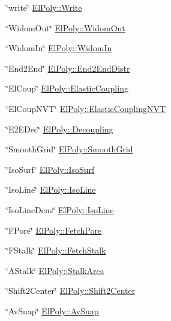 \begin{DoxyItemize}
\item \char`\"{}write\char`\"{} \hyperlink{classVarData_a054aab836dcf7735720ef32e0b8f7ecb}{\-El\-Poly\-::\-Write} 
\item \char`\"{}\-Widom\-Out\char`\"{} \hyperlink{classElPoly_aa7a92147aff6a466398908e0f92ca139}{\-El\-Poly\-::\-Widom\-Out} 
\item \char`\"{}\-Widom\-In\char`\"{} \hyperlink{classElPoly_a3e5c7ada1f6d5a2d37b23a9fb12771f9}{\-El\-Poly\-::\-Widom\-In} 
\item \char`\"{}\-End2\-End\char`\"{} \hyperlink{classElPoly_a15ee2b235143aabc133fe974aa3258a2}{\-El\-Poly\-::\-End2\-End\-Distr} 
\item \char`\"{}\-El\-Coup\char`\"{} \hyperlink{classElPoly_a48968ddc44376e55852e9720b3827ebe}{\-El\-Poly\-::\-Elastic\-Coupling} 
\item \char`\"{}\-El\-Coup\-N\-V\-T\char`\"{} \hyperlink{classElPoly_ab88192e9e4e0f11b68ad828d73ff8957}{\-El\-Poly\-::\-Elastic\-Coupling\-N\-V\-T} 
\item \char`\"{}\-E2\-E\-Dec\char`\"{} \hyperlink{classElPoly_a44e20767e332d941b94906f1a8e60e24}{\-El\-Poly\-::\-Decoupling} 
\item \char`\"{}\-Smooth\-Grid\char`\"{} \hyperlink{classVarData_a3d0e967c8f2515c16170245de47ffcbe}{\-El\-Poly\-::\-Smooth\-Grid} 
\item \char`\"{}\-Iso\-Surf\char`\"{} \hyperlink{classElPoly_a23b08e53b2acd3090051d2034632c20f}{\-El\-Poly\-::\-Iso\-Surf} 
\item \char`\"{}\-Iso\-Line\char`\"{} \hyperlink{classElPoly_a7af346569b401863e3d5f4541e85e0c4}{\-El\-Poly\-::\-Iso\-Line} 
\item \char`\"{}\-Iso\-Line\-Dens\char`\"{} \hyperlink{classElPoly_a7af346569b401863e3d5f4541e85e0c4}{\-El\-Poly\-::\-Iso\-Line} 
\item \char`\"{}\-F\-Pore\char`\"{} \hyperlink{classElPoly_aecd33584d71ae498798338253cbf83f0}{\-El\-Poly\-::\-Fetch\-Pore} 
\item \char`\"{}\-F\-Stalk\char`\"{} \hyperlink{classElPoly_a21a28de0471580af1978c3a48ae0ba0e}{\-El\-Poly\-::\-Fetch\-Stalk} 
\item \char`\"{}\-A\-Stalk\char`\"{} \hyperlink{classElPoly_a099625012512857cb5524bf15b397e5e}{\-El\-Poly\-::\-Stalk\-Area} 
\item \char`\"{}\-Shift2\-Center\char`\"{} \hyperlink{classElPoly_a2d5b51a7f120a4104f6e5070ca6c55f5}{\-El\-Poly\-::\-Shift2\-Center} 
\item \char`\"{}\-Av\-Snap\char`\"{} \hyperlink{classElPoly_aafe33ef0f28995ba7c1a778196decf9b}{\-El\-Poly\-::\-Av\-Snap} 

\end{DoxyItemize}
